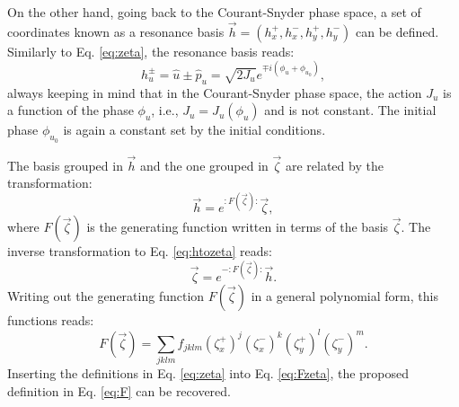 On the other hand, going back to the Courant-Snyder phase space, a set of coordinates known as a resonance basis $\vec{h} = \left( h_x^+ , h_x^-, h_y^+, h_y^-\right)$ can be defined. Similarly to Eq. \ref{eq:zeta}, the resonance basis reads:
\begin{equation}
    \label{eq:hbasis}
    h_u^{\pm}=\hat{u}\pm \hat{p}_u=\sqrt{2J_u}e^{\mp i\left( \phi_u + \phi_{u_0}\right)},
\end{equation}
always keeping in mind that in the Courant-Snyder phase space, the action $J_u$ is a function of the phase $\phi_u$, i.e., $J_u = J_u(\phi_u)$ and is not constant. The initial phase $\phi_{u_0}$ is again a constant set by the initial conditions. 

The basis grouped in $\vec{h}$ and the one grouped in $\vec{\zeta}$ are related by the transformation:
\begin{equation}
    \label{eq:htozeta}
    \vec{h}=e^{:F \left(\vec{\zeta}\right):}\vec{\zeta},
\end{equation}
where $F(\vec{\zeta})$ is the generating function written in terms of the basis $\vec{\zeta}$. The inverse transformation to Eq. \ref{eq:htozeta} reads:
\begin{equation}
    \label{eq:zetatoh}
    \vec{\zeta}=e^{-:F\left( \vec{\zeta} \right):}\vec{h}.
\end{equation}
Writing out the generating function $F(\vec{\zeta})$ in a general polynomial form, this functions reads:
\begin{equation}
    \label{eq:Fzeta}
    F\left( \vec{\zeta} \right)=\sum_{jklm} f_{jklm} \left({\zeta_x^{+}}\right)^{j} \left({\zeta_x^{-}}\right)^k \left({\zeta_y^{+}}\right)^l \left({\zeta_y^{-}}\right)^m.
\end{equation}
Inserting the definitions in Eq. \ref{eq:zeta} into Eq. \ref{eq:Fzeta}, the proposed definition in Eq. \ref{eq:F} can be recovered.

